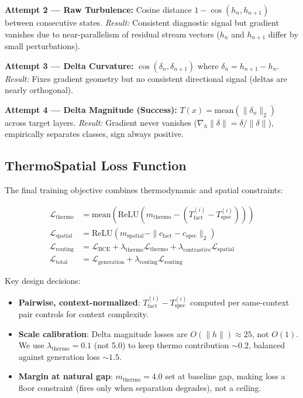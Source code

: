 \documentclass[11pt,a4paper]{article}
\begin{document}
\textbf{Attempt 2 --- Raw Turbulence:} Cosine distance $1 - \cos(h_n, h_{n+1})$ between consecutive states. \emph{Result:} Consistent diagnostic signal but gradient vanishes due to near-parallelism of residual stream vectors ($h_n$ and $h_{n+1}$ differ by small perturbations).

\textbf{Attempt 3 --- Delta Curvature:} $\cos(\delta_n, \delta_{n+1})$ where $\delta_n = h_{n+1} - h_n$. \emph{Result:} Fixes gradient geometry but no consistent directional signal (deltas are nearly orthogonal).

\textbf{Attempt 4 --- Delta Magnitude (Success):} $T(x) = \text{mean}(\|\delta_n\|_2)$ across target layers. \emph{Result:} Gradient never vanishes ($\nabla_h \|\delta\| = \delta / \|\delta\|$), empirically separates classes, sign always positive.

\subsection{ThermoSpatial Loss Function}

The final training objective combines thermodynamic and spatial constraints:

\begin{align}
\mathcal{L}_\text{thermo} &= \text{mean}\left(\text{ReLU}\left(m_\text{thermo} - (T_\text{fact}^{(i)} - T_\text{spec}^{(i)})\right)\right) \label{eq:thermo} \\
\mathcal{L}_\text{spatial} &= \text{ReLU}\left(m_\text{spatial} - \|c_\text{fact} - c_\text{spec}\|_2\right) \label{eq:spatial} \\
\mathcal{L}_\text{routing} &= \mathcal{L}_\text{BCE} + \lambda_\text{thermo} \mathcal{L}_\text{thermo} + \lambda_\text{contrastive} \mathcal{L}_\text{spatial} \label{eq:routing} \\
\mathcal{L}_\text{total} &= \mathcal{L}_\text{generation} + \lambda_\text{routing} \mathcal{L}_\text{routing} \label{eq:total}
\end{align}

Key design decisions:
\begin{itemize}
\item \textbf{Pairwise, context-normalized}: $T_\text{fact}^{(i)} - T_\text{spec}^{(i)}$ computed per same-context pair controls for context complexity.
\item \textbf{Scale calibration}: Delta magnitude losses are $O(\|h\|) \approx 25$, not $O(1)$. We use $\lambda_\text{thermo} = 0.1$ (not 5.0) to keep thermo contribution $\sim 0.2$, balanced against generation loss $\sim 1.5$.
\item \textbf{Margin at natural gap}: $m_\text{thermo} = 4.0$ set at baseline gap, making loss a floor constraint (fires only when separation degrades), not a ceiling.
\end{itemize}
\end{document}
